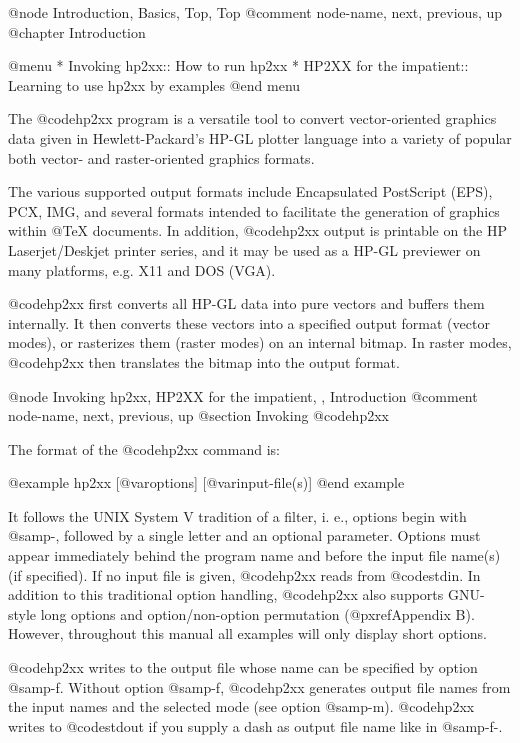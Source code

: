 @node Introduction, Basics, Top, Top
@comment  node-name,  next,  previous,  up
@chapter Introduction

@menu
* Invoking hp2xx::          How to run hp2xx
* HP2XX for the impatient:: Learning to use hp2xx by examples
@end menu

The @code{hp2xx} program is a versatile tool to convert vector-oriented
graphics data given in Hewlett-Packard's HP-GL plotter language
into a variety of popular both vector- and raster-oriented graphics formats.

The various supported output formats include Encapsulated PostScript (EPS),
PCX, IMG, and several formats intended to facilitate the generation of
graphics within @TeX{} documents.
In addition, @code{hp2xx} output is printable on the HP Laserjet/Deskjet
printer series, and it may be used as a HP-GL previewer on many
platforms, e.g. X11 and DOS (VGA).

@code{hp2xx} first converts all HP-GL data into pure vectors and buffers
them internally. It then converts these vectors into a specified output
format (vector modes), or rasterizes them (raster modes) on an internal
bitmap. In raster modes, @code{hp2xx} then translates the bitmap into the
output format.



@node Invoking hp2xx, HP2XX for the impatient, , Introduction
@comment  node-name,  next,  previous,  up
@section Invoking @code{hp2xx}

The format of the @code{hp2xx} command is:

@example
hp2xx [@var{options}] [@var{input-file(s)}]
@end example

It follows the UNIX System V tradition of a filter, i. e., options begin
with @samp{-}, followed by a single letter and an optional parameter.
Options must appear immediately behind the program name and before the input
file name(s) (if specified). If no input file is given, @code{hp2xx} reads
from @code{stdin}. In addition to this traditional option handling,
@code{hp2xx} also supports GNU-style long options and option/non-option
permutation (@pxref{Appendix B}). However, throughout this manual
all examples will only display short options.

@code{hp2xx} writes to the output file whose name can be specified
by option @samp{-f}. Without option @samp{-f}, @code{hp2xx} generates
output file names from the input names and the selected mode
(see option @samp{-m}). @code{hp2xx} writes to @code{stdout} if you supply
a dash as output file name like in @samp{-f-}.



